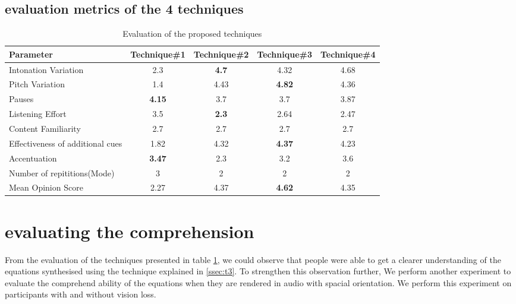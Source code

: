 \documentclass{article}
\begin{document}
\subsection{evaluation metrics of the 4 techniques}
\label{ssec:eval}
\begin{table}[t]
\centering
\caption{Evaluation of the proposed techniques}

\vspace{8pt} %

\begin{tabularx}{\textwidth}{|l |c |c |c |c|}
\hline%
Parameter   & Technique\#1 & Technique\#2 & Technique\#3 & Technique\#4 \\[0.5ex]
\hline
Intonation Variation  & 2.3 & \textbf{4.7} & 4.32 & 4.68 \\
\hline
Pitch  Variation & 1.4 & 4.43 & \textbf{4.82} & 4.36\\
\hline
Pauses  & \textbf{4.15} & 3.7 & 3.7 & 3.87 \\
\hline
Listening Effort  & 3.5 & \textbf{2.3} & 2.64 & 2.47\\
\hline
Content Familiarity  &2.7 &2.7 &2.7 &2.7\\
\hline
Effectiveness of additional cues  &1.82 & 4.32 & \textbf{4.37} & 4.23\\
\hline
Accentuation &\textbf{3.47} & 2.3 & 3.2 & 3.6 \\
\hline
Number of repititions(Mode) & 3 & 2 & 2 & 2\\
\hline
Mean Opinion Score  & 2.27 & 4.37 & \textbf{4.62} & 4.35\\ %
\hline


\end{tabularx}
\label{table:eval}
\end{table}


\section{evaluating the comprehension}
\label{sec:comprehension}
 From the evaluation of the techniques presented in table \ref{table:eval}, we could observe that people were able to get a clearer understanding of the equations synthesised using the technique explained in \ref{ssec:t3}. To strengthen this observation further, We perform another experiment to evaluate the comprehend ability of the equations when they are rendered in audio with spacial orientation. We perform this experiment on participants with and without vision loss. 
\end{document}
